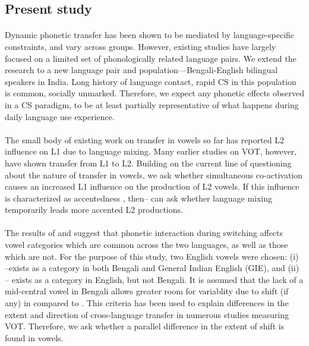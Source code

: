 \documentclass[11pt]{article}
\newcommand{\nt}[1]{\textipa{[#1]}} %
\newcommand{\wt}[1]{\textipa{/#1/}} %
\begin{document}
\subsection{Present study}
\paragraph{}Dynamic phonetic transfer has been shown to be mediated by language-specific constraints, and vary across groups. However, existing studies have largely focused on a limited set of phonologically related language pairs. We extend the research to a new language pair and population—Bengali-English bilingual speakers in India. Long history of language contact, rapid CS in this population is common, socially unmarked. Therefore, we expect any phonetic effects observed in a CS paradigm, to be at least partially representative of what happens during daily language use experience.

\paragraph{}The small body of existing work on transfer in vowels so far has reported L2 influence on L1 due to language mixing. Many earlier studies on VOT, however, have shown transfer from L1 to L2. Building on the current line of questioning about the nature of transfer in vowels, we ask whether simultaneous co-activation causes an increased L1 influence on the production of L2 vowels. If this influence is characterized as accentedness \cite{goldrick2014language}, then-- can ask whether language mixing temporarily leads more accented L2 productions. 


\paragraph{}The results of \cite{simonet2014phonetic} and \cite{elias2017effects} suggest that phonetic interaction during switching affects vowel categories which are common across the two languages, as well as those which are not. For the purpose of this study, two English vowels were chosen:
(i) \wt{\ae}--exists as a category in both Bengali and General Indian English (GIE)\cite{masica1972sound}, and (ii) \wt{2}-- exists as a category in English, but not Bengali. It is assumed that the lack of a mid-central vowel in Bengali allows greater room for variablity due to shift (if any) in \nt{2} compared to \nt{\ae}. This criteria has been used to explain differences in the extent and direction of cross-language transfer in numerous studies measuring VOT. Therefore, we ask whether a parallel difference in the extent of shift is found in vowels. 
\end{document}
